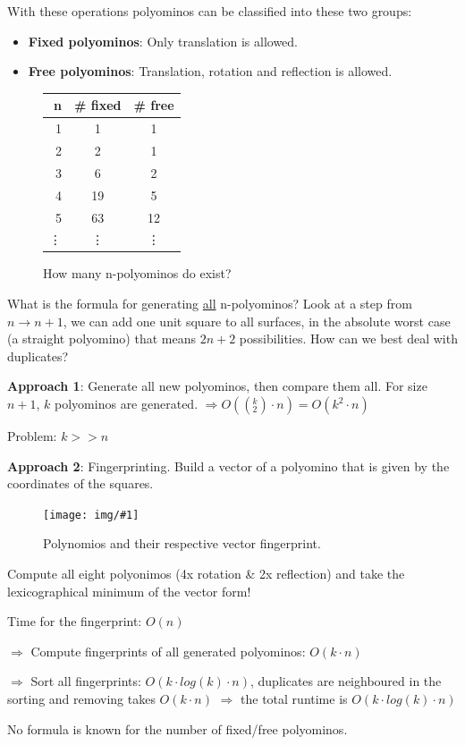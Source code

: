 \documentclass[12pt,onecolumn%
]{scrartcl}
\newcommand{\img}[3]{
\begin{figure}[H]
	\centering
	\texttt{[image: img/\#1]}
	\captionsetup{width=0.8\textwidth, justification=centering}
	\caption{#3}
\end{figure}
}
\newcommand{\fig}[2]{
\begin{figure}[H]
	\centering
	#1
	\captionsetup{width=0.8\textwidth, justification=centering}
	\caption{#2}
\end{figure}
}
\begin{document}
With these operations polyominos can be classified into these two groups: 
\begin{itemize}
	\item {\bf Fixed polyominos}: Only translation is allowed.
	\item {\bf Free polyominos}: Translation, rotation and reflection is allowed.	
\end{itemize}

\fig{
\begin{tabular}{| r | c | c |}
  \hline
  n & \# fixed & \# free \\
  \hline	
  1 & 1 & 1 \\
  2 & 2 & 1 \\
  3 & 6 & 2 \\
  4 & 19 & 5 \\
  5 & 63 & 12 \\
  \vdots & \vdots & \vdots 
\end{tabular}}{How many n-polyominos do exist?}

What is the formula for generating \underline{all} n-polyominos? Look at a step from $n \to n+1$, we can add one unit square to all surfaces, in the absolute worst case (a straight polyomino) that means $2n+2$ possibilities. How can we best deal with duplicates?

{\bf Approach 1}: Generate all new polyominos, then compare them all. For size $n+1$, $k$ polyominos are generated. $\Rightarrow O((_2^k) \cdot n) = O(k^2 \cdot n)$ 

Problem: $k >> n$

{\bf Approach 2}: Fingerprinting. Build a vector of a polyomino that is given by the coordinates of the squares.

\img{polyominos_vector}
	{scale=1, trim=275 505 360 125}
	{Polynomios and their respective vector fingerprint.}
	
Compute all eight polyonimos (4x rotation \& 2x reflection) and take the lexicographical minimum of the vector form!

Time for the fingerprint: $O(n)$

$\Rightarrow$ Compute fingerprints of all generated polyominos: $O(k \cdot n)$

$\Rightarrow$ Sort all fingerprints: $O(k \cdot log(k) \cdot n)$, duplicates are neighboured in the sorting and removing takes $O(k \cdot n)$
$\Rightarrow$ the total runtime is $O(k \cdot log(k) \cdot n)$

No formula is known for the number of fixed/free polyominos.
\end{document}
